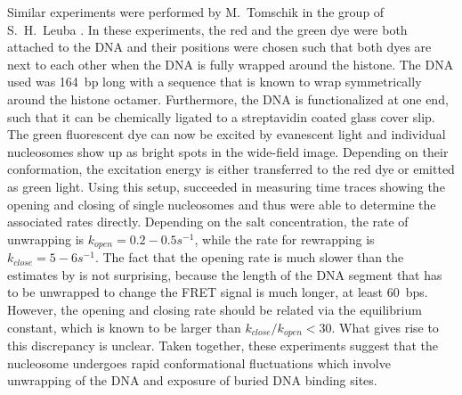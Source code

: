 Similar experiments were performed by M.~Tomschik in the group of S.~H.~Leuba \cite{Tomschik_PNAS_05}.
In these experiments, the red and the green dye were both attached to the DNA and their positions were
chosen such that both dyes are next to each other when the DNA is fully wrapped around the 
histone. The DNA used was 164~bp long with a sequence that is known to wrap symmetrically around the
histone octamer. Furthermore, the DNA is functionalized at one end, such that it can be chemically
ligated to a streptavidin coated glass cover slip. The green fluorescent dye 
can now be excited by evanescent light and individual nucleosomes show up as 
bright spots in the wide-field image. Depending on their conformation, the excitation energy
is either transferred to the red dye or emitted as green light. Using this setup, \citeauthor{Tomschik_PNAS_05}
succeeded in measuring time traces showing the opening and closing of single nucleosomes and 
thus were able to determine the associated rates directly. Depending on the salt concentration,
the rate of unwrapping is $k_{open}=0.2-0.5 s^{-1}$, while the rate for rewrapping is $k_{close}=5-6 s^{-1}$.
The fact that the opening rate is much slower than the estimates by \citeauthor{Li_NatureStructMolBio_05} is
not surprising, because the length of the DNA segment that has to be unwrapped to change the FRET
signal is much longer, at least 60~bps. However, the opening and closing rate should be related via
the equilibrium constant, which is known to be larger than $k_{close}/k_{open}<30$. What gives rise 
to this discrepancy is unclear. 
Taken together, these experiments suggest that the nucleosome undergoes rapid conformational 
fluctuations which involve unwrapping of the DNA and exposure of buried DNA binding sites. 
  
